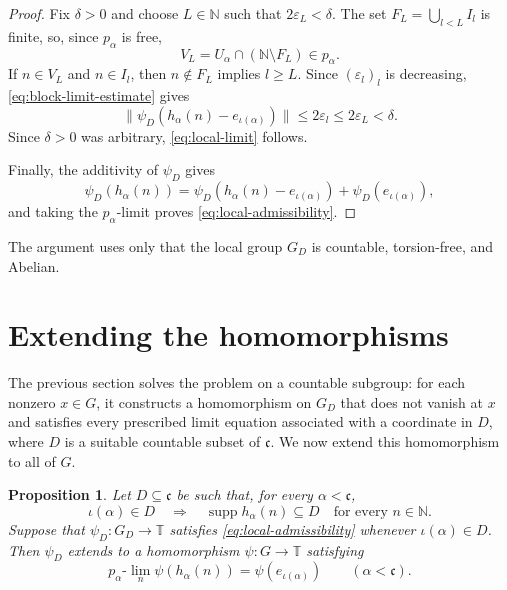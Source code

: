 \documentclass[11pt]{amsart}
\newtheorem{proposition}[theorem]{Proposition}
\theoremstyle{definition}
\newcommand{\T}{\mathbb T}
\newcommand{\N}{\mathbb N}
\newcommand{\cfrak}{\mathfrak c}
\newcommand{\supp}{\operatorname{supp}}
\begin{document}
\begin{proof}
Fix $\delta>0$ and choose $L\in\N$ such that $2\varepsilon_L<\delta$.
The set $F_L=\bigcup_{l<L}I_l$ is finite, so, since $p_\alpha$ is free,
\[
 V_L=U_\alpha\cap(\N\setminus F_L)\in p_\alpha.
\]
If $n\in V_L$ and $n\in I_l$, then $n\notin F_L$ implies $l\geq L$.
Since $(\varepsilon_l)_l$ is decreasing, \eqref{eq:block-limit-estimate}
gives
\[
 \|\psi_D(h_\alpha(n)-e_{\iota(\alpha)})\|
 \leq 2\varepsilon_l\leq 2\varepsilon_L<\delta.
\]
Since $\delta>0$ was arbitrary, \eqref{eq:local-limit} follows.

Finally, the additivity of $\psi_D$ gives
\[
 \psi_D(h_\alpha(n))
 =
 \psi_D(h_\alpha(n)-e_{\iota(\alpha)})
 +
 \psi_D(e_{\iota(\alpha)}),
\]
and taking the $p_\alpha$-limit proves
\eqref{eq:local-admissibility}.
\end{proof}

The argument uses only that the local group $G_D$ is countable,
torsion-free, and Abelian.

\section{Extending the homomorphisms}

The previous section solves the problem on a countable subgroup: for each
nonzero $x\in G$, it constructs a homomorphism on $G_D$ that does not vanish
at $x$ and satisfies every prescribed limit equation associated with a
coordinate in $D$, where $D$ is a suitable countable subset of $\cfrak$.
We now extend this homomorphism to all of $G$.

\begin{proposition}\label{prop:transfinite-extension}
Let $D\subseteq\cfrak$ be such that, for every $\alpha<\cfrak$,
\[
 \iota(\alpha)\in D\quad\Longrightarrow\quad
 \supp h_\alpha(n)\subseteq D\quad\text{for every }n\in\N.
\]
Suppose that $\psi_D:G_D\to\T$ satisfies
\eqref{eq:local-admissibility} whenever $\iota(\alpha)\in D$.  Then
$\psi_D$ extends to a homomorphism $\psi:G\to\T$ satisfying
\[
 p_\alpha\text{-}\lim_n\psi(h_\alpha(n))
 =\psi(e_{\iota(\alpha)})
 \qquad(\alpha<\cfrak).
\]
\end{proposition}
\end{document}
